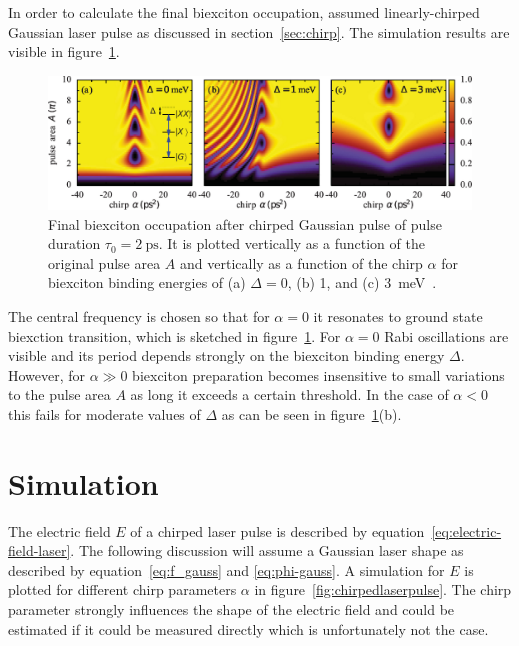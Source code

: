 In order to calculate the final biexciton occupation, \textcite{glassl_biexciton_2013} assumed linearly-chirped Gaussian laser pulse as discussed in section~\ref{sec:chirp}.
The simulation results are visible in figure~\ref{fig:biexciton-occupation}.
\begin{figure}[H]
	\centering
	\includegraphics[width=\linewidth]{figures/chirp/biexciton-occupation}
	\caption{Final biexciton occupation after chirped Gaussian pulse of pulse duration $\tau_0 = \SI{2}{\pico \second}$.
		It is plotted vertically as a function of the original pulse area $A$ and vertically as a function of the chirp $\alpha$ for biexciton binding energies of (a) $\Delta=0$, (b) 1, and (c) \SI{3}{\milli \electronvolt}~\cite{glassl_biexciton_2013}.}
	\label{fig:biexciton-occupation}
\end{figure}
The central frequency is chosen so that for $\alpha=0$ it resonates to ground state biexction transition, which is sketched in figure~\ref{fig:biexciton-occupation}.
For $\alpha=0$ Rabi oscillations are visible and its period depends strongly on the biexciton binding energy $\Delta$.
However, for $\alpha \gg 0$ biexciton preparation becomes insensitive to small variations to the pulse area $A$ as long it exceeds a certain threshold.
In the case of $\alpha < 0$ this fails for moderate values of $\Delta$ as can be seen in figure~\ref{fig:biexciton-occupation}(b).


\section{Simulation}

The electric field $E$ of a chirped laser pulse is described by equation~\eqref{eq:electric-field-laser}.
The following discussion will assume a Gaussian laser shape as described by equation~\eqref{eq:f_gauss} and \eqref{eq:phi-gauss}.
A simulation for $E$ is plotted for different chirp parameters $\alpha$  in figure~\ref{fig:chirpedlaserpulse}.
The chirp parameter strongly influences the shape of the electric field and could be estimated if it could be measured directly which is unfortunately not the case.

